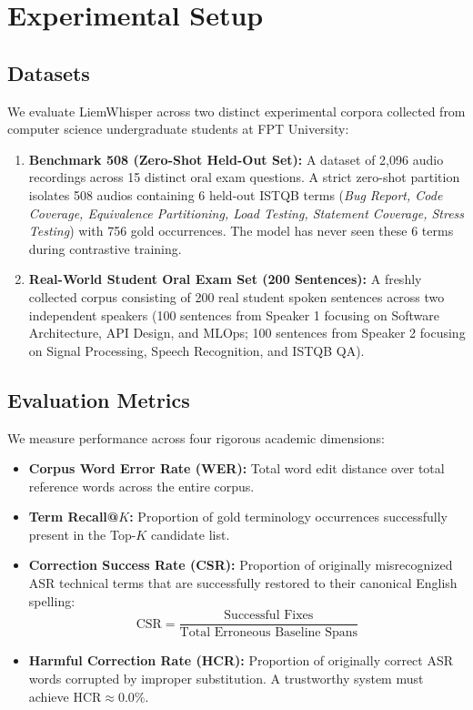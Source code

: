 \documentclass[11pt,conference,onecolumn]{IEEEtran}
\begin{document}
\section{Experimental Setup}

\subsection{Datasets}
We evaluate LiemWhisper across two distinct experimental corpora collected from computer science undergraduate students at FPT University:
\begin{enumerate}
    \item \textbf{Benchmark 508 (Zero-Shot Held-Out Set):} A dataset of 2,096 audio recordings across 15 distinct oral exam questions. A strict zero-shot partition isolates 508 audios containing 6 held-out ISTQB terms (\textit{Bug Report, Code Coverage, Equivalence Partitioning, Load Testing, Statement Coverage, Stress Testing}) with 756 gold occurrences. The model has never seen these 6 terms during contrastive training.
    \item \textbf{Real-World Student Oral Exam Set (200 Sentences):} A freshly collected corpus consisting of 200 real student spoken sentences across two independent speakers (100 sentences from Speaker 1 focusing on Software Architecture, API Design, and MLOps; 100 sentences from Speaker 2 focusing on Signal Processing, Speech Recognition, and ISTQB QA).
\end{enumerate}

\subsection{Evaluation Metrics}
We measure performance across four rigorous academic dimensions:
\begin{itemize}
    \item \textbf{Corpus Word Error Rate (WER):} Total word edit distance over total reference words across the entire corpus.
    \item \textbf{Term Recall@$K$:} Proportion of gold terminology occurrences successfully present in the Top-$K$ candidate list.
    \item \textbf{Correction Success Rate (CSR):} Proportion of originally misrecognized ASR technical terms that are successfully restored to their canonical English spelling:
    $$\text{CSR} = \frac{\text{Successful Fixes}}{\text{Total Erroneous Baseline Spans}}$$
    \item \textbf{Harmful Correction Rate (HCR):} Proportion of originally correct ASR words corrupted by improper substitution. A trustworthy system must achieve $\text{HCR} \approx 0.0\%$.
\end{itemize}
\end{document}

